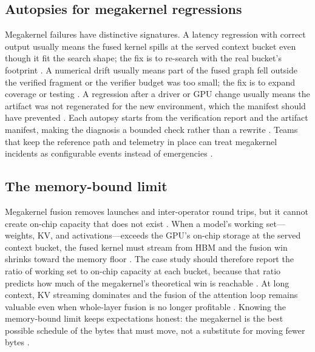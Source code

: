\subsection{Autopsies for megakernel regressions}

Megakernel failures have distinctive signatures. A latency regression with correct output usually means the fused kernel spills at the served context bucket even though it fit the search shape; the fix is to re-search with the real bucket's footprint \citep{mpk2025,memoryfloor2026}. A numerical drift usually means part of the fused graph fell outside the verified fragment or the verifier budget was too small; the fix is to expand coverage or testing \citep{wu2024mirage,patel2025llminference}. A regression after a driver or GPU change usually means the artifact was not regenerated for the new environment, which the manifest should have prevented \citep{chen2020compilerbasedhardw,taxbreak2026}. Each autopsy starts from the verification report and the artifact manifest, making the diagnosis a bounded check rather than a rewrite \citep{wu2024mirage,memoryfloor2026}. Teams that keep the reference path and telemetry in place can treat megakernel incidents as configurable events instead of emergencies \citep{patel2025llminference,mpk2025}.

\subsection{The memory-bound limit}

Megakernel fusion removes launches and inter-operator round trips, but it cannot create on-chip capacity that does not exist \citep{wu2024mirage,memoryfloor2026}. When a model's working set—weights, KV, and activations—exceeds the GPU's on-chip storage at the served context bucket, the fused kernel must stream from HBM and the fusion win shrinks toward the memory floor \citep{memoryfloor2026,taxbreak2026}. The case study should therefore report the ratio of working set to on-chip capacity at each bucket, because that ratio predicts how much of the megakernel's theoretical win is reachable \citep{wu2024mirage,patel2025llminference}. At long context, KV streaming dominates and the fusion of the attention loop remains valuable even when whole-layer fusion is no longer profitable \citep{dao2022flashattention,mpk2025}. Knowing the memory-bound limit keeps expectations honest: the megakernel is the best possible schedule of the bytes that must move, not a substitute for moving fewer bytes \citep{memoryfloor2026,wu2024mirage}.

